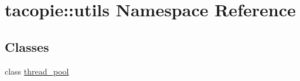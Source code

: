 \hypertarget{namespacetacopie_1_1utils}{}\section{tacopie\+:\+:utils Namespace Reference}
\label{namespacetacopie_1_1utils}
\subsection*{Classes}
\begin{DoxyCompactItemize}
\item 
class \hyperlink{classtacopie_1_1utils_1_1thread__pool}{thread\+\_\+pool}
\end{DoxyCompactItemize}
